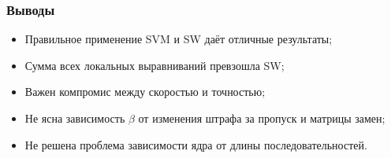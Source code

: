 \documentclass{beamer}
\begin{document}
\begin{frame}
\frametitle{Выводы}
\begin{itemize}
    \item Правильное применение SVM и SW даёт отличные результаты;
    \item Сумма всех локальных выравниваний превзошла SW;
    \item Важен компромис между скоростью и точностью;
    \item Не ясна зависимость $\beta$ от изменения
        штрафа за пропуск и матрицы замен;
    \item Не решена проблема зависимости ядра от длины последовательностей.
\end{itemize}
\end{frame}


\end{document}
